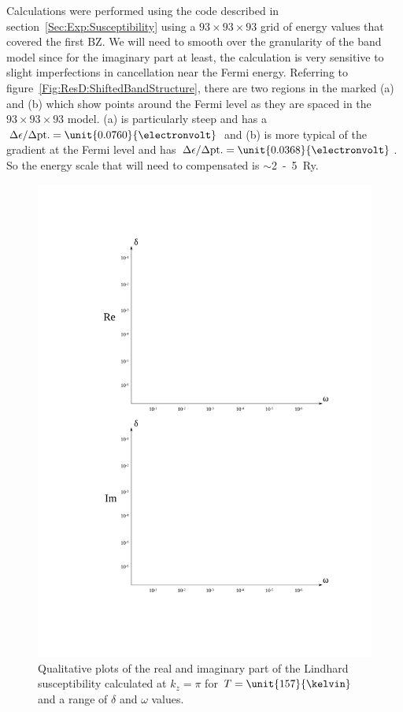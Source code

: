 Calculations were performed using the  code described in section~\ref{Sec:Exp:Susceptibility} using a $93\times93\times93$ grid of energy values that covered the first \ac{BZ}. We will need to smooth over the granularity of the \WIEN{} band model since for the imaginary part at least, the calculation is very sensitive to slight imperfections in cancellation near the Fermi energy. Referring to figure~\ref{Fig:ResD:ShiftedBandStructure}, there are two regions in the marked (a) and (b) which show points around the Fermi level as they are spaced in the $93\times93\times93$ model. (a) is particularly steep and has a $\Delta \epsilon/\Delta\textrm{pt.} = \unit{0.0760}{\electronvolt}$ and (b) is more typical of the gradient at the Fermi level and has $\Delta \epsilon/\Delta\textrm{pt.} = \unit{0.0368}{\electronvolt}$. So the energy scale that will need to compensated is $\sim$\unit{2-5}{\textrm{\textrm{Ry}}}.

\begin{figure}[htbp]
    \begin{center}
        \includegraphics[scale=0.9]{Chapter-dHvABaFe2P2/Figures/Susceptibility/RangeDeltaOmega/RangeDeltaOmega}
        \caption{Qualitative plots of the real and imaginary part of the Lindhard susceptibility calculated at $k_z=\pi$ for $T=\unit{157}{\kelvin}$ and a range of $\delta$ and $\omega$ values.}
        \label{Fig:ResD:RangeDeltaOmega}
    \end{center}
\end{figure}

